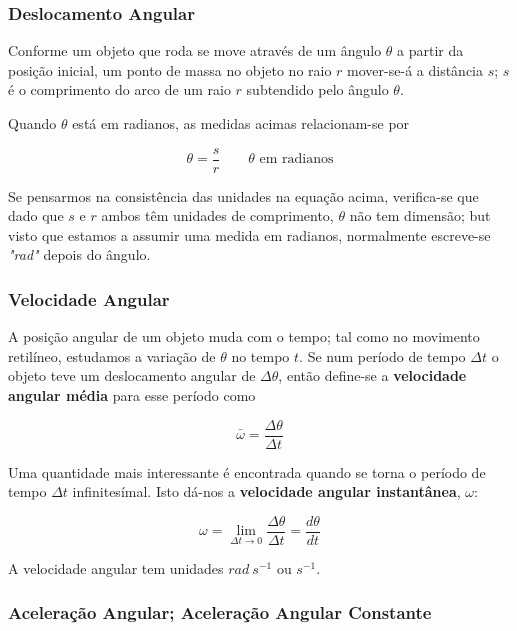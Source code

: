 \subsubsection{Deslocamento Angular}
Conforme um objeto que roda se move através de um ângulo $\theta$ a partir da posição inicial, um ponto de massa no objeto no raio $r$ mover-se-á a distância $s$; $s$ é o comprimento do arco de um raio $r$ subtendido pelo ângulo $\theta$.

Quando $\theta$ está em radianos, as medidas acimas relacionam-se por

\begin{equation}
    \theta=\frac{s}{r} \qquad \theta \text{ em radianos}
\end{equation}

Se pensarmos na consistência das unidades na equação acima, verifica-se que dado que $s$ e $r$ ambos têm unidades de comprimento, $\theta$ não tem dimensão; but visto que estamos a assumir uma medida em radianos, normalmente escreve-se \emph{"rad"} depois do ângulo.

\subsubsection{Velocidade Angular}
A posição angular de um objeto muda com o tempo; tal como no movimento retilíneo, estudamos a variação de $\theta$ no tempo $t$. Se num período de tempo $\Delta t$ o objeto teve um deslocamento angular de $\Delta \theta$, então define-se a \textbf{velocidade angular média} para esse período como

\begin{equation}
    \bar{\omega}=\frac{\Delta \theta}{\Delta t}
\end{equation}

Uma quantidade mais interessante é encontrada quando se torna o período de tempo $\Delta t$ infinitesímal. Isto dá-nos a \textbf{velocidade angular instantânea}, $\omega$:

\begin{equation}
    \omega = \lim_{\Delta t \to 0}\frac{\Delta \theta}{\Delta t}=\frac{d\theta}{dt}
\end{equation}

A velocidade angular tem unidades $rad\ s^{-1}$ ou $s^{-1}$.

\subsubsection{Aceleração Angular; Aceleração Angular Constante}


